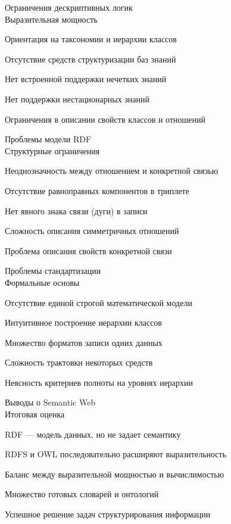 \begin{frame}{Ограничения дескриптивных логик\\Выразительная мощность}
	\topline
	\justifying
	\begin{textitemize}
		\item Ориентация на таксономии и иерархии классов
		\item Отсутствие средств структуризации баз знаний
		\item Нет встроенной поддержки нечетких знаний
		\item Нет поддержки нестационарных знаний
		\item Ограничения в описании свойств классов и отношений
	\end{textitemize}
\end{frame}

\begin{frame}{Проблемы модели RDF\\Структурные ограничения}
	\topline
	\justifying
	\begin{textitemize}
		\item Неоднозначность между отношением и конкретной связью
		\item Отсутствие равноправных компонентов в триплете
		\item Нет явного знака связи (дуги) в записи
		\item Сложность описания симметричных отношений
		\item Проблема описания свойств конкретной связи
	\end{textitemize}
\end{frame}

\begin{frame}{Проблемы стандартизации\\Формальные основы}
	\topline
	\justifying
	\begin{textitemize}
		\item Отсутствие единой строгой математической модели
		\item Интуитивное построение иерархии классов
		\item Множество форматов записи одних данных
		\item Сложность трактовки некоторых средств
		\item Неясность критериев полноты на уровнях иерархии
	\end{textitemize}
\end{frame}

\begin{frame}{Выводы о Semantic Web\\Итоговая оценка}
	\topline
	\justifying
	\begin{textitemize}
		\item RDF --- модель данных, но не задает семантику
		\item RDFS и OWL последовательно расширяют выразительность
		\item Баланс между выразительной мощностью и вычислимостью
		\item Множество готовых словарей и онтологий
		\item Успешное решение задач структурирования информации
	\end{textitemize}
\end{frame}

